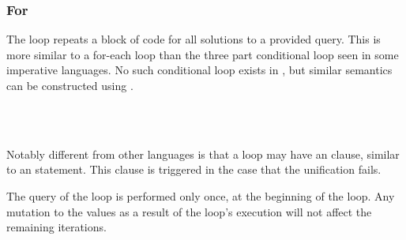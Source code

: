 \subsubsection{For}

The  loop repeats a block of code for all solutions to a provided query.
This is more similar to a for-each loop than the three part conditional loop seen in
some imperative languages. No such conditional  loop exists in \Trilogy{},
but similar semantics can be constructed using .

\begin{bnf*}
     \\
     \\
\end{bnf*}

Notably different from other languages is that a  loop may have an  clause,
similar to an  statement. This  clause is triggered in the case that the
unification fails.

The query of the  loop is performed only once, at the beginning of the loop.
Any mutation to the values as a result of the loop's execution will not affect the remaining
iterations.

\begin{prooftree}
\end{prooftree}

\begin{prooftree}
\end{prooftree}

\begin{prooftree}
\end{prooftree}

